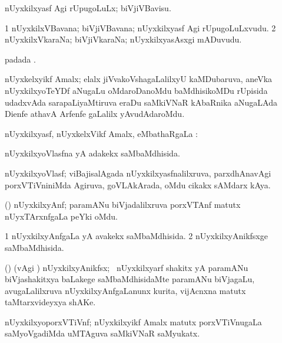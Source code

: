 \noindent
\gl{\akirx}
\bmng
nUyxkilxyasf Agi rUpugoLuLx; biVjiVBavisu. 
\emng
\eentry

\bentry
{}
\gl{\nA}
\bmng
\bnum
\num{1} nUyxkilxVBavana; biVjiVBavana; nUyxkilxyasf Agi rUpugoLuLxvudu. 
\num{2} nUyxkilxVkaraNa; biVjiVkaraNa; nUyxkilxyasAsxgi mADuvudu. 
\enum
\emng
\eentry

\bentry
{}
\gl{\nA}
\bmng
{} padada \bava. 
\emng
\eentry

\bentry
{}
\gl{\nA}
\bmng
nUyxkelxyikf Amalx; elalx jiVvakoVshagaLalilxyU kaMDubaruva, aneVka nUyxkilxyoTeYDf aNugaLu oMdaroDanoMdu baMdhisikoMDu rUpisida udadxvAda sarapaLiyaMtiruva eraDu saMkiVNaR kAbaRnika aNugaLAda Dienfe athavA Arfenfe gaLalilx yAvudAdaroMdu. 
\emng
\eentry

\bentry
{}
\gl{\sapUpa}
\bmng
nUyxkilxyasf, nUyxkelxVikf Amalx, eMbathaRgaLa \sapUpa:  
\emng
\eentry

\bentry
{}
\gl{\gu}
\bmng
nUyxkilxyoVlasfna yA adakekx saMbaMdhisida. 
\emng
\eentry

\bentry
{}
\gl{\nA}
\bmng
nUyxkilxyoVlasf; viBajisalAgada nUyxkilxyasfnalilxruva, parxdhAnavAgi porxVTiVniniMda Agiruva, goVLAkArada, oMdu cikakx sAMdarx kAya. 
\emng
\eentry

\bentry
{}
\gl{\nA}
\bmng
(\Bwvi) nUyxkilxyAnf; paramANu biVjadalilxruva porxVTAnf matutx nUyxTArxnfgaLa peYki oMdu. 
\emng
\eentry

\bentry
{}
\gl{\gu}
\bmng
\bnum
\num{1} nUyxkilxyAnfgaLa yA avakekx saMbaMdhisida. 
\num{2} nUyxkilxyAnikfsxge saMbaMdhisida. 
\enum
\emng
\eentry

\bentry
{}
\gl{\nA}
\bmng
(\bava) (\Eva vAgi \parx) nUyxkilxyAnikfsx; \kanmu\ nUyxkilxyarf shakitx yA paramANu biVjashakitxya baLakege saMbaMdhisidaMte paramANu biVjagaLu, avugaLalilxruva nUyxkilxyAnfgaLanunx kurita, vijAcnxna matutx taMtarxvideyxya shAKe. 
\emng
\eentry

\bentry
{}
\gl{\nA}
\bmng
nUyxkilxyoporxVTiVnf; nUyxkilxyikf Amalx matutx porxVTiVnugaLa saMyoVgadiMda uMTAguva saMkiVNaR saMyukatx. 
\emng
\eentry

